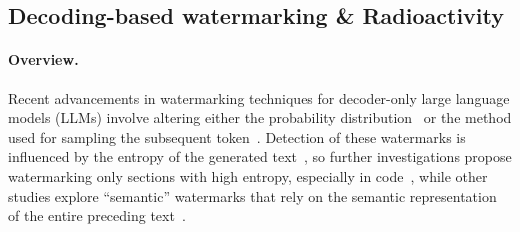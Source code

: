 \subsection{Decoding-based watermarking \& Radioactivity}\label{subsec:related_kirch}

\paragraph{\textbf{Overview.}} 
Recent advancements in watermarking techniques for decoder-only large language models (LLMs) involve altering either the probability distribution~\citep{kirchenbauer2023watermark} or the method used for sampling the subsequent token~\citep{aaronson2023watermarking, kuditipudi2023robust}.
Detection of these watermarks is influenced by the entropy of the generated text~\citep{christ2023undetectable, huang2023optimal}, so further investigations propose watermarking only sections with high entropy, especially in code~\citep{lee2023wrote}, while other studies explore ``semantic'' watermarks that rely on the semantic representation of the entire preceding text~\citep{liu2023semantic, liu2024adaptive, fu2024watermarking}.


